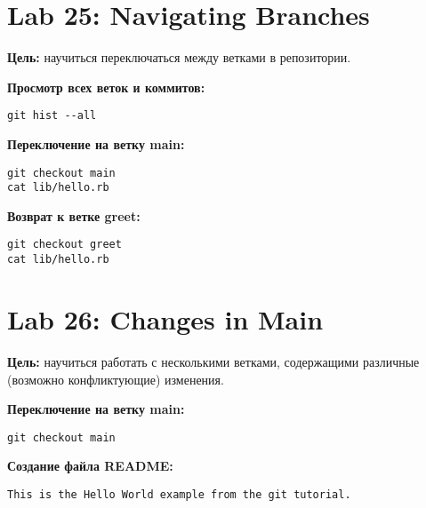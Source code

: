 \documentclass[a4paper,12pt]{report}
\begin{document}
\section{Lab 25: Navigating Branches}

\textbf{Цель:} научиться переключаться между ветками в репозитории.

\textbf{Просмотр всех веток и коммитов:}
\begin{verbatim}
git hist --all
\end{verbatim}


\textbf{Переключение на ветку main:}
\begin{verbatim}
git checkout main
cat lib/hello.rb
\end{verbatim}


\textbf{Возврат к ветке greet:}
\begin{verbatim}
git checkout greet
cat lib/hello.rb
\end{verbatim}


\section{Lab 26: Changes in Main}

\textbf{Цель:} научиться работать с несколькими ветками, содержащими различные (возможно конфликтующие) изменения.

\textbf{Переключение на ветку main:}
\begin{verbatim}
git checkout main
\end{verbatim}


\textbf{Создание файла README:}
\begin{verbatim}
This is the Hello World example from the git tutorial.
\end{verbatim}
\end{document}
